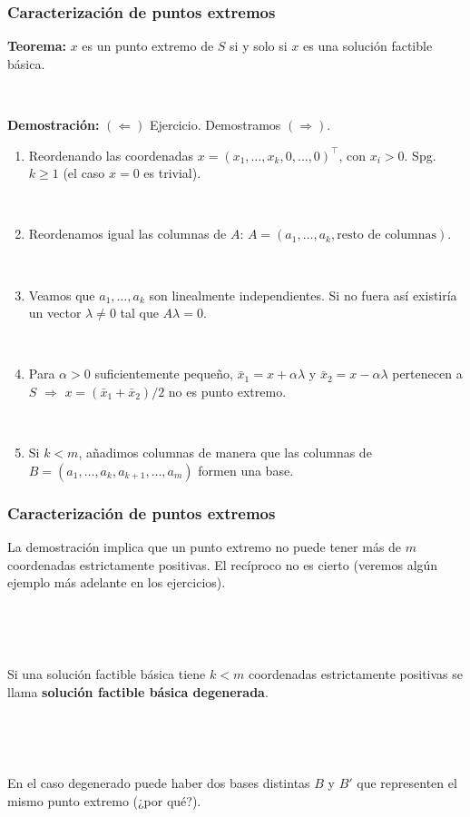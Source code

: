 \documentclass{beamer}
\begin{document}
\begin{frame}
\frametitle{Caracterización de puntos extremos}

{\bf Teorema:} $x$ es un punto extremo de $S$ si y solo si $x$ es una solución factible básica.
 
\

{\scriptsize
{\bf Demostración:} $(\Leftarrow)$ Ejercicio. Demostramos $(\Rightarrow)$.

\begin{enumerate}
\item  Reordenando las coordenadas $x=(x_1,\ldots,x_k,0,\ldots,0)^\top$, con $x_i>0$. Spg. $k\geq 1$ (el caso $x=0$ es trivial).

\

\item Reordenamos igual las columnas de $A$: $A=(a_1,\ldots,a_k,\mbox{resto de columnas})$.

\

\item Veamos que $a_1,\ldots,a_k$ son linealmente independientes. Si no fuera así existiría un vector $\lambda \neq 0$ tal que $A\lambda=0$.

\

\item Para $\alpha> 0$ suficientemente pequeño, $\bar x_1=x+\alpha\lambda$ y $\bar x_2=x-\alpha\lambda$ pertenecen a $S$ $\Rightarrow$ $x=(\bar x_1+\bar x_2)/2$ no es punto extremo.

\

\item Si $k < m$, añadimos columnas de manera que las columnas de $B=(a_1,\ldots,a_k,a_{k+1},\ldots,a_m)$ formen una base.
\end{enumerate}
} 
\end{frame}
\begin{frame}
\frametitle{Caracterización de puntos extremos}

La demostración implica que un punto extremo  no puede tener más de $m$ coordenadas estrictamente positivas. El recíproco no es cierto (veremos algún ejemplo más adelante en los ejercicios).

\

\

Si una solución factible básica tiene $k<m$ coordenadas estrictamente positivas se llama \textbf{solución factible básica degenerada}.

\

\

En el caso degenerado puede haber dos bases distintas $B$ y $B'$ que representen el mismo punto extremo (¿por qué?).


\end{frame}
\end{document}
